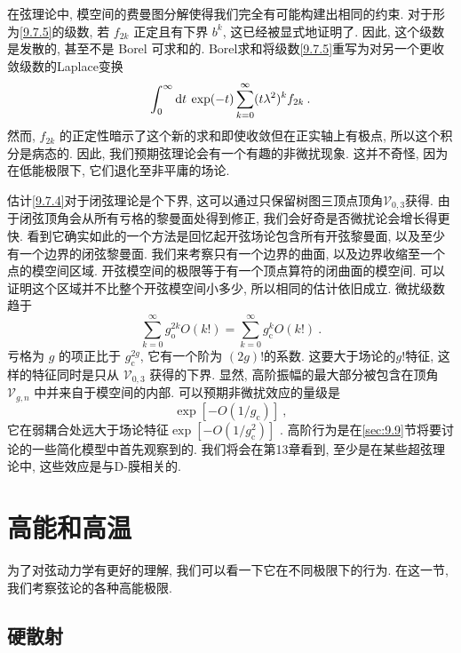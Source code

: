 在弦理论中, 模空间的费曼图分解使得我们完全有可能构建出相同的约束. 对于形为\eqref{9.7.5}的级数, 若 $f_{2 k}$ 正定且有下界 $b^{k}$, 这已经被显式地证明了. 
因此, 这个级数是发散的, 甚至不是 Borel 可求和的. Borel求和将级数\eqref{9.7.5}重写为对另一个更收敛级数的Laplace变换
\begin{equation}
	\int_{0}^{\infty} \mathrm{d} t\: \exp (-t) \sum_{k=0}^{\infty}(t \lambda^{2})^{k} f_{2 k} \:. \label{9.7.7}
\end{equation}
然而, $f_{2 k}$ 的正定性暗示了这个新的求和即使收敛但在正实轴上有极点, 所以这个积分是病态的. 
因此, 我们预期弦理论会有一个有趣的非微扰现象. 这并不奇怪, 因为在低能极限下, 它们退化至非平庸的场论.

估计\eqref{9.7.4}对于闭弦理论是个下界, 这可以通过只保留树图三顶点顶角$\mathscr{V}_{0,3}$获得. 
由于闭弦顶角会从所有亏格的黎曼面处得到修正, 我们会好奇是否微扰论会增长得更快. 看到它确实如此的一个方法是回忆起开弦场论包含所有开弦黎曼面, 
以及至少有一个边界的闭弦黎曼面. 我们来考察只有一个边界的曲面, 以及边界收缩至一个点的模空间区域. 
开弦模空间的极限等于有一个顶点算符的闭曲面的模空间. 可以证明这个区域并不比整个开弦模空间小多少, 所以相同的估计依旧成立. 微扰级数趋于
\begin{equation}
	\sum_{k=0}^{\infty} g_{\mathrm{o}}^{2 k} O(k !)=\sum_{k=0}^{\infty} g_{\mathrm{c}}^{k} O(k !) \:. \label{9.7.8}
\end{equation}
亏格为 $g$ 的项正比于 $g_{\mathrm{c}}^{2 g}$, 它有一个阶为 $(2g)!$的系数. 这要大于场论的$g !$特征, 
这样的特征同时是只从 $\mathscr{V}_{0,3}$ 获得的下界. 显然, 高阶振幅的最大部分被包含在顶角 $\mathscr{V}_{g, n}$ 中并来自于模空间的内部. 
可以预期非微扰效应的量级是
\begin{equation}
	\exp [-O(1/g_{\mathrm{c}})] \:, \label{9.7.9}
\end{equation}
它在弱耦合处远大于场论特征$\exp[-O(1 / g_{\mathrm{c}}^{2})]$ . 高阶行为是在\ref{sec:9.9}节将要讨论的一些简化模型中首先观察到的. 
我们将会在第13章看到, 至少是在某些超弦理论中, 这些效应是与D-膜相关的.


\section{高能和高温} \label{sec:9.8}%

为了对弦动力学有更好的理解, 我们可以看一下它在不同极限下的行为. 在这一节, 我们考察弦论的各种高能极限.

\subsection*{硬散射}

